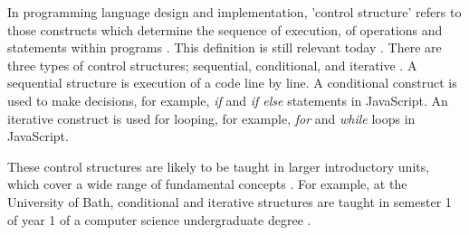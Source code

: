 \documentclass[a4paper,11.5pt]{report}
\numberwithin{figure}{section}
\numberwithin{table}{section}
\numberwithin{equation}{section}
\numberwithin{equation}{section}
\begin{document}
In programming language design and implementation, 'control structure' refers to those constructs which determine the sequence of execution, of operations and statements within programs \citep{riccardi1981}. This definition is still relevant today \citep[see][]{wikiversity}. There are three types of control structures; sequential, conditional, and iterative \citep{leppanen2007}. A sequential structure is execution of a code line by line. A conditional construct is used to make decisions, for example, \textit{if} and \textit{if else} statements in JavaScript. An iterative construct is used for looping, for example, \textit{for} and \textit{while} loops in JavaScript.

These control structures are likely to be taught in larger introductory units, which cover a wide range of fundamental concepts \citep{acm}. For example, at the University of Bath, conditional and iterative structures are taught in semester 1 of year 1 of a computer science undergraduate degree \citep{bath}. 




\end{document}
